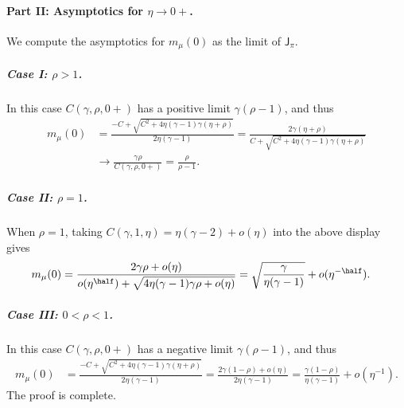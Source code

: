 \documentclass[11pt]{article}
\newcommand{\jfunc}{\mathsf{J}}
\begin{document}


\paragraph{Part II: Asymptotics for $\eta \to 0+$.} 
We compute the asymptotics for $m_\mu(0)$ as the limit of $\jfunc_{\pi}$.
\subparagraph{Case I: $\rho > 1$.} In this case $C(\gamma, \rho, 0+)$ has a positive limit $\gamma(\rho-1)$, and thus
\begin{align*}
    m_{\mu}(0) & = \frac{-C+\sqrt{C^2+4 \eta(\gamma-1) \gamma(\eta+\rho)}}{2 \eta(\gamma-1)} = \frac{2\gamma(\eta+\rho)}{C+\sqrt{C^2+4 \eta(\gamma-1) \gamma(\eta+\rho)}} \nonumber \\
    & \to \frac{\gamma \rho}{C(\gamma, \rho, 0+)} = \frac{\rho}{\rho-1}. 
\end{align*}
\subparagraph{Case II: $\rho = 1$.} When $\rho=1$, taking $C(\gamma, 1, \eta) = \eta(\gamma-2) + o(\eta)$ into the above display gives
\begin{align*}
    m_{\mu}(0) & = \frac{2\gamma \rho + o(\eta)}{o(\eta^\half)+\sqrt{4 \eta(\gamma-1) \gamma \rho + o(\eta)}} = \sqrt{\frac{\gamma}{\eta(\gamma-1)}} + o(\eta^{-\half}).
\end{align*}
\subparagraph{Case III: $0<\rho < 1$.} In this case $C(\gamma, \rho, 0+)$ has a negative limit $\gamma(\rho-1)$, and thus
\begin{align*}
    m_{\mu}(0) & = \frac{-C+\sqrt{C^2+4 \eta(\gamma-1) \gamma(\eta+\rho)}}{2 \eta(\gamma-1)} = \frac{2\gamma(1-\rho) + o(\eta)}{2 \eta(\gamma-1)} = \frac{\gamma(1-\rho)}{\eta(\gamma-1)} + o(\eta^{-1}).
\end{align*}
The proof is complete.
\end{document}
